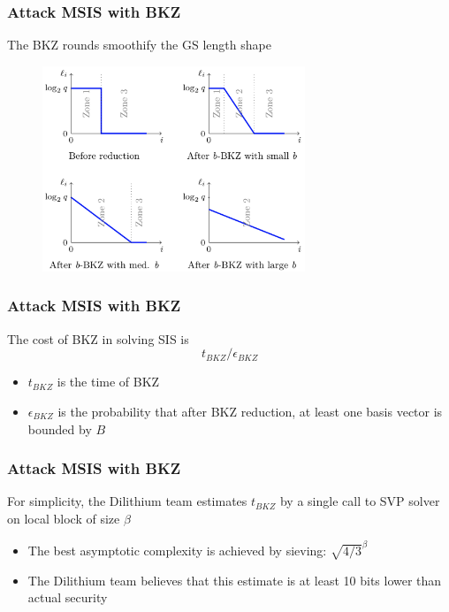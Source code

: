 \documentclass{beamer}
\begin{document}
\frame
{
  \frametitle{Attack MSIS with BKZ}
  The BKZ rounds smoothify the GS length shape

  \begin{figure}[ht!]
  \includegraphics[width=0.7\textwidth]{files/bkz-sis.png}
  \end{figure}
}

\frame
{
  \frametitle{Attack MSIS with BKZ}
  The cost of BKZ in solving SIS is
  \[t_{BKZ}/\epsilon_{BKZ}\]
  \begin{itemize}
    \item $t_{BKZ}$ is the time of BKZ
    \item $\epsilon_{BKZ}$ is the probability that after BKZ reduction, at least one basis vector is bounded by $B$
  \end{itemize}
}

\frame
{
  \frametitle{Attack MSIS with BKZ}
  For simplicity, the Dilithium team estimates $t_{BKZ}$ by a single call to SVP solver on local block of size $\beta$
  \begin{itemize}
    \item The best asymptotic complexity is achieved by sieving: $\sqrt{4/3}^{\beta}$
    \item The Dilithium team believes that this estimate is at least 10 bits lower than actual security
  \end{itemize}
}
\end{document}
